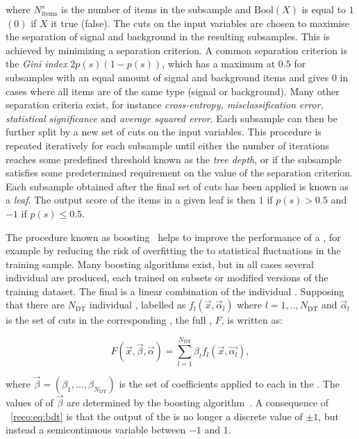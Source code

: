 where $N_{\textrm{items}}^{s}$ is the number of items in the subsample and $\textrm{Bool}(X)$ is equal to $1$ $(0)$ if $X$ it true (false). 
The cuts on the input variables are chosen to maximise the separation of signal and background in the resulting subsamples. This is achieved by minimizing a separation criterion. 
A common separation criterion is the \emph{Gini index} $2p(s)(1-p(s))$, which has a maximum at $0.5$ for subsamples with an equal amount of signal and background items and gives $0$ in cases where all items are of the same type (signal or background). Many other separation criteria exist, for instance \emph{cross-entropy, misclassification error, statistical significance} and \emph{average squared error}.
Each subsample can then be further split by a new set of cuts on the input variables. This procedure is repeated iteratively for each subsample until either the number of iterations reaches some predefined threshold known as the \emph{tree depth}, or if the subsample satisfies some predetermined requirement on the value of the separation criterion. Each subsample obtained after the final set of cuts has been applied is known as a \emph{leaf}. The output score of the items in a given leaf is then $1 $ if $p(s)>0.5$ and $-1$ if $p(s)\leq0.5$.

The procedure known as boosting~\cite{friedman2001} helps to improve the performance of a \DT, for example by reducing the risk of overfitting the \DT to statistical fluctuations in the training sample. Many boosting algorithms exist, but in all cases several individual \DT\s are produced, each trained on subsets or modified versions of the training dataset. The final \BDT is a linear combination of the individual \DT\s. Supposing that there are $N_{\textrm{DT}}$ individual \DT\s, labelled as $f_{l}(\vec{x},\vec{\alpha}_{l})$ where $l=1,..,N_{\textrm{DT}}$ and $\vec{\alpha}_{l}$ is the set of cuts in the corresponding \DT, the full \BDT, $F$, is written as:

\begin{equation}
\label{reco:eq:bdt}
F(\vec{x},\vec{\beta},\vec{\alpha}) = \sum_{l=1}^{N_{\textrm{DT}}} \beta_{l} f_{l}(\vec{x},\vec{\alpha_{l}}), 
\end{equation}

where $\vec{\beta}=(\beta_{1},...,\beta_{N_{\textrm{DT}}})$ is the set of coefficients applied to each \DT in the \BDT. The values of of $\vec{\beta}$ are determined by the boosting algorithm~\cite{friedman2009,TMVA}. A consequence of \Eq~\ref{reco:eq:bdt} is that the output of the \BDT is no longer a discrete value of $\pm1$, but instead a semicontinuous variable between $-1$ and $1$. 

